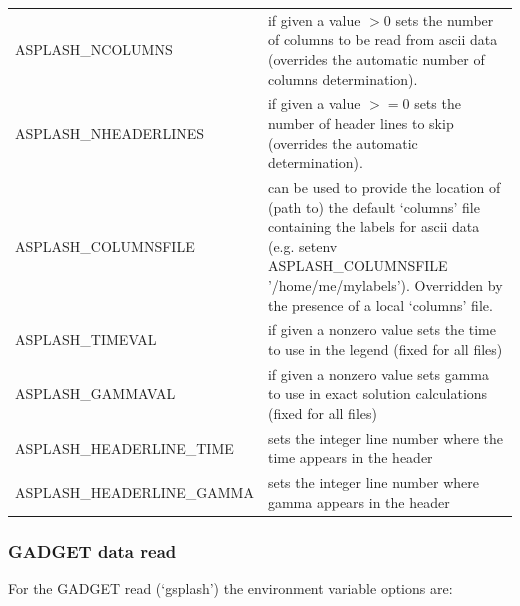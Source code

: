 \documentclass[a4paper,10pt]{article}
\begin{document}
\begin{tabular}{p{}p{}}
ASPLASH\_NCOLUMNS & if given a value $>$0 sets the number of columns to be read from ascii data (overrides the automatic number of
columns determination). \\
ASPLASH\_NHEADERLINES & if given a value $>=$0 sets the number of header lines to skip (overrides the automatic determination). \\
ASPLASH\_COLUMNSFILE & can be used to provide the location of (path to) the default `columns' file containing the labels for ascii data (e.g. setenv ASPLASH\_COLUMNSFILE '/home/me/mylabels'). Overridden by the presence of a local `columns' file. \\
ASPLASH\_TIMEVAL & if given a nonzero value sets the time to use in the legend (fixed for all files) \\
ASPLASH\_GAMMAVAL & if given a nonzero value sets gamma to use in exact solution calculations (fixed for all files) \\
ASPLASH\_HEADERLINE\_TIME & sets the integer line number where the time appears in the header \\
ASPLASH\_HEADERLINE\_GAMMA & sets the integer line number where gamma appears in the header \\
\end{tabular}

\subsubsection{ GADGET data read}
\label{sec:gsplash}
 For the GADGET read (`gsplash') the environment variable options are:\newline
\end{document}
